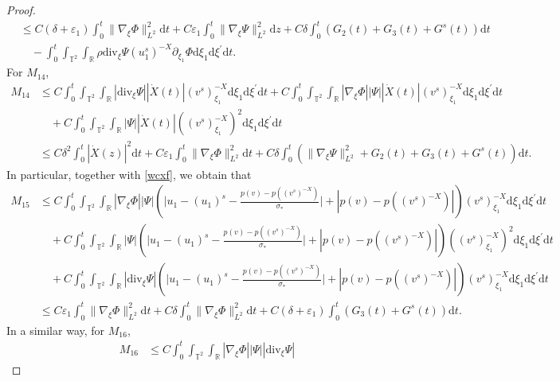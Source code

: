 \documentclass[10pt,reqno]{amsart}
\numberwithin{equation}{section}
\newcommand{\dif}{\mathrm{d}}
\newcommand{\ddiv}{\mathrm{div}}
\begin{document}
\begin{proof}
\begin{align*}
&\le  C(\delta+\varepsilon_1)\int_0^t\|\nabla_\xi\Phi\|_{L^2}^2\dif t
+C\varepsilon_1\int_0^t\|\nabla_\xi\Psi\|_{L^2}^2\dif z
+C\delta\int_0^t\left(G_2(t)+G_3(t)+G^s(t)\right)\dif t\\
&\quad-\int_0^t\int_{\mathbb{T}^2}\int_{\mathbb{R}}
\rho\ddiv_\xi\Psi(u_1^s)^{-X}\partial_{\xi_1}\Phi\dif \xi_1\dif \xi^{\prime}\dif t.
\end{align*}
For $M_{14}$,
\begin{align*}
M_{14}&\le
C\int_0^t\int_{\mathbb{T}^2}\int_{\mathbb{R}}
 |\ddiv_\xi\Psi|  |\dot{X}(t)|(v^s)^{-X}_{\xi_1}
    \dif \xi_1\dif \xi^{\prime}\dif t+
C\int_0^t\int_{\mathbb{T}^2}\int_{\mathbb{R}}
 |\nabla_\xi\Phi||\Psi|  |\dot{X}(t)|(v^s)^{-X}_{\xi_1}
    \dif \xi_1\dif \xi^{\prime}\dif t\\
&\quad+C\int_0^t\int_{\mathbb{T}^2}\int_{\mathbb{R}}
|\Psi|  |\dot{X}(t)|\left((v^s)^{-X}_{\xi_1}\right)^2
    \dif \xi_1\dif \xi^{\prime}\dif t\\
&\le C\delta^2\int_0^t|\dot X(z)|^2\dif t
+C\varepsilon_1\int_0^t\|\nabla_\xi\Phi\|_{L^2}^2\dif t
+C\delta\int_0^t\left(\|\nabla_\xi\Psi\|_{L^2}^2+G_2(t)+G_3(t)+G^s(t)\right)\dif t.
\end{align*}
In particular, together with \eqref{wcxf}, we obtain that
\begin{align*}
M_{15}&\le
C\int_0^t\int_{\mathbb{T}^2}\int_{\mathbb{R}}
      |\nabla_\xi\Phi||\Psi| \left(\Big|u_1-(u_1)^s-\frac{p(v)-p((v^s)^{-X})}{\sigma_\ast}\Big|
      +|p(v)-p((v^s)^{-X})|\right)(v^s)^{-X}_{\xi_1}
        \dif \xi_1\dif \xi^{\prime}\dif t\\
&\quad+C\int_0^t\int_{\mathbb{T}^2}\int_{\mathbb{R}}
  |\Psi| \left(\Big|u_1-(u_1)^s-\frac{p(v)-p((v^s)^{-X})}{\sigma_\ast}\Big|
      +|p(v)-p((v^s)^{-X})|\right)\left((v^s)^{-X}_{\xi_1}\right)^2
        \dif \xi_1\dif \xi^{\prime}\dif t\\
&\quad+C\int_0^t\int_{\mathbb{T}^2}\int_{\mathbb{R}}
      |\ddiv_\xi\Psi|
      \left(\Big|u_1-(u_1)^s-\frac{p(v)-p((v^s)^{-X})}{\sigma_\ast}\Big|
      +|p(v)-p((v^s)^{-X})|\right)(v^s)^{-X}_{\xi_1}
        \dif \xi_1\dif \xi^{\prime}\dif t\\
&\le C\varepsilon_1\int_0^t\|\nabla_\xi\Phi\|_{L^2}^2\dif t
+C\delta\int_0^t\|\nabla_\xi\Phi\|_{L^2}^2\dif t+
C(\delta+\varepsilon_1)\int_0^t\left(G_3(t)+G^s(t)\right)\dif t.
\end{align*}
In a similar way, for $M_{16}$,
\begin{align*}
M_{16}&\le C\int_0^t\int_{\mathbb{T}^2}\int_{\mathbb{R}}
  |\nabla_\xi\Phi||\Psi||\ddiv_\xi\Psi|

\end{align*}
\end{proof}
\end{document}
